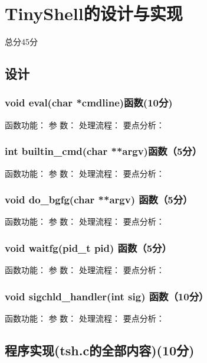 \section{TinyShell的设计与实现}
\begin{center}
    总分45分
\end{center}

\subsection{设计}

\subsubsection{void eval(char *cmdline)函数(10分)}

函数功能：
参   数：
处理流程：
要点分析：

\subsubsection{int builtin\_cmd(char **argv)函数（5分）}

函数功能：
参   数：
处理流程：
要点分析：

\subsubsection{void do\_bgfg(char **argv) 函数（5分）}

函数功能：
参   数：
处理流程：
要点分析：

\subsubsection{void waitfg(pid\_t pid) 函数（5分）}

函数功能：
参   数：
处理流程：
要点分析：

\subsubsection{void sigchld\_handler(int sig) 函数（10分）}

函数功能：  
参   数：  
处理流程：  
要点分析：  

\subsection{程序实现(tsh.c的全部内容)(10分)}
